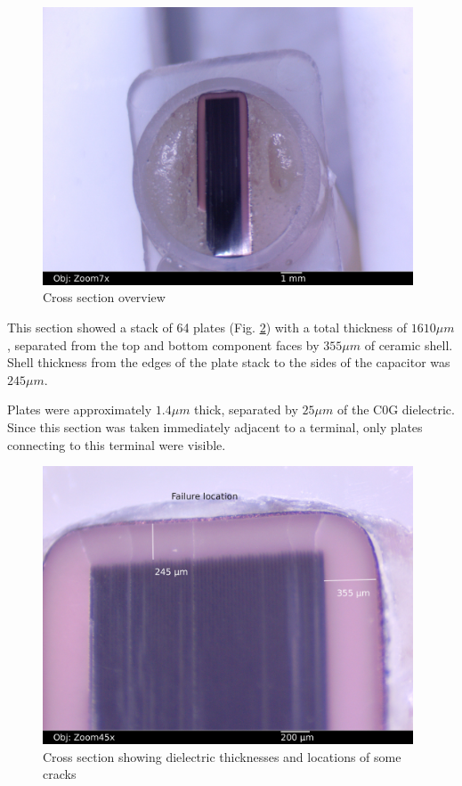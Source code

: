 \documentclass{article}
\begin{document}
\begin{figure}[h]
\includegraphics[width=11cm,keepaspectratio]{07-section1-7x_annotated.jpg}
\caption{Cross section overview}
\label{section-overview}
\end{figure}

This section showed a stack of 64 plates (Fig. \ref{section-plates}) with a total thickness of $1610 \mu m$, separated
from the top and bottom component faces by $355 \mu m$ of ceramic shell. Shell thickness from the edges of the plate
stack to the sides of the capacitor was $245 \mu m$.

Plates were approximately $1.4 \mu m$ thick, separated by $25 \mu m$ of the C0G dielectric. Since this section was
taken immediately adjacent to a terminal, only plates connecting to this terminal were visible.

\begin{figure}[h]
\includegraphics[width=11cm,keepaspectratio]{06-section1-45x_annotated2.jpg}
\caption{Cross section showing dielectric thicknesses and locations of some cracks}
\label{section-plates}
\end{figure}
\end{document}
